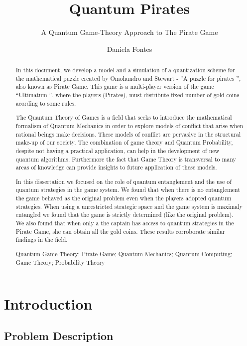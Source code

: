 \documentclass[10pt,twocolumn]{llncs}
\title{Quantum Pirates} %
\subtitle{A Quantum Game-Theory Approach to The Pirate Game}
\author{Daniela Fontes}
\institute{	72390\\
		Instituto Superior T\'ecnico
\\
\email{daniela.fontesl@ist.utl.pt}
}
\begin{document}
	\maketitle

	\begin{abstract}
		In this document, we develop a model and a simulation of a quantization scheme for the mathematical puzzle created by Omohundro and Stewart - ``A puzzle for pirates '', also known as Pirate Game. This game is a multi-player version of the game ``Ultimatum '', where the players (Pirates), must distribute fixed number of gold coins acording to some rules.

The Quantum Theory of Games is a field that seeks to introduce the mathematical formalism of Quantum Mechanics in order to explore models of conflict that arise when rational beings make decisions. These models of conflict are pervasive in the structural make-up of our society. The combination of game theory and Quantum Probability, despite not having a practical application, can help in the development of new quantum algorithms. Furthermore the fact that Game Theory is transversal to many areas of knowledge can provide insights to future application of these models.

In this dissertation we focused on the role of quantum entanglement and the use of quantum strategies in the game system. We found that when there is no entanglement the game behaved as the original problem even when the players adopted quantum strategies. When using a unrestricted strategic space and the game system is maximaly entangled we found that the game is strictly determined (like the original problem). We also found that when only a the captain has access to quantum strategies in the Pirate Game, she can obtain all the gold coins. These results corroborate similar findings in the field.

		\keywords Quantum Game Theory; Pirate Game; Quantum Mechanics; Quantum Computing; Game Theory; Probability Theory

\end{abstract}

\section{Introduction}


\subsection{Problem Description}
\label{sec:int_problem}
\end{document}
